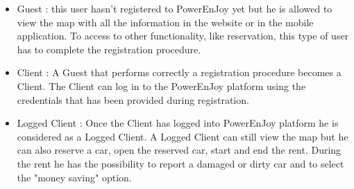 \begin{itemize}
\item Guest : this user hasn't registered to PowerEnJoy yet but he is allowed to view the map with all the information in the website or in the mobile application. To access to other functionality, like reservation, this type of user has to complete the registration procedure.

\item Client : A Guest that performs correctly a registration procedure becomes a Client. The Client can log in to the PowerEnJoy platform using the credentials that has been provided during registration.

\item Logged Client : Once the Client has logged into PowerEnJoy platform he is considered as a Logged Client. A Logged Client can still view the map but he can also reserve a car, open the reserved car, start and end the rent. During the rent he has the possibility to report a damaged or dirty car and to select the "money saving" option. 
\end{itemize}